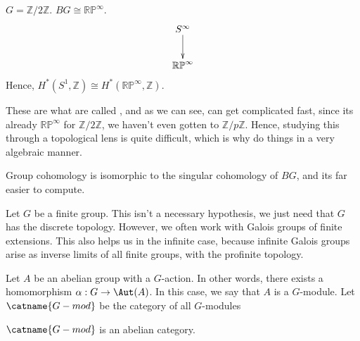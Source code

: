 \documentclass[12pt]{scrartcl}
\begin{document}
\begin{example}
$G = \mathbb{Z}/2 \mathbb{Z}$.
$BG \cong \mathbb{RP}^{\infty}$.
\[
\begin{array}{c}
	\xymatrix{
	S^{\infty}\ar[d] \\
\mathbb{RP}^{\infty}
	}
\end{array}
\]
Hence, $H^{*}(S^1, \mathbb{Z}) \cong H^{*}(\mathbb{RP}^{\infty}, \mathbb{Z})$.
\end{example}
These are what are called , and as we can see, can get complicated fast, since its already $\mathbb{RP}^{\infty}$ for $\mathbb{Z}/2 \mathbb{Z}$, we haven't even gotten to $\mathbb{Z}/p \mathbb{Z}$.
Hence, studying this through a topological lens is quite difficult, which is why do things in a very algebraic manner.

Group cohomology is isomorphic to the singular cohomology of $BG$, and its far easier to compute. 

Let $G$ be a finite group.
This isn't a necessary hypothesis, we just need that $G$ has the discrete topology. 
However, we often work with Galois groups of finite extensions.
This also helps us in the infinite case, because infinite Galois groups arise as inverse limits of all finite groups, with the profinite topology.
\begin{definition}
Let $A$ be an abelian group with a $G$-action.
In other words, there exists a homomorphism $\alpha: G \to \Aut(A)$.
In this case, we say that $A$ is a $G$-module.
Let $\catname{G-mod}$ be the category of all $G$-modules
\end{definition}

\begin{exercise}
	$\catname{G-mod}$ is an abelian category. 
\end{exercise}
\end{document}
